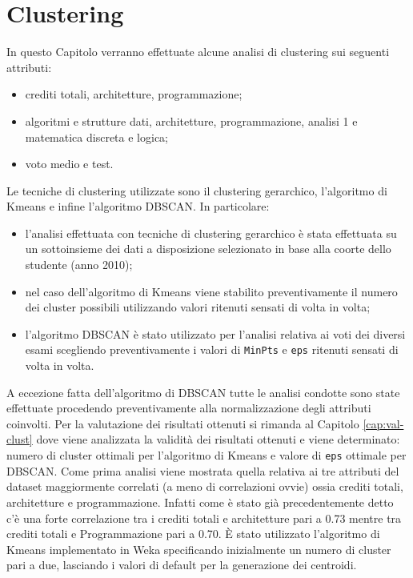 \documentclass[12pt]{article}
\begin{document}
\section{Clustering}
\label{cap:clust}
In questo Capitolo verranno effettuate alcune analisi di clustering sui se\-guenti attributi:
\begin{itemize}
\item crediti totali, architetture, programmazione;
\item algoritmi e strutture dati, architetture, programmazione, analisi 1 e matematica discreta e logica;
\item voto medio e test.
\end{itemize}
Le tecniche di clustering utilizzate sono il clustering gerarchico, l'algori\-tmo di Kmeans e infine l'algoritmo DBSCAN. In particolare:
\begin{itemize}
\item l'analisi effettuata con tecniche di clustering gerarchico è stata effet\-tuata su un sottoinsieme dei dati a disposizione selezionato in base alla coorte dello studente (anno 2010);
\item nel caso dell'algoritmo di Kmeans viene stabilito preventivamente il numero dei cluster possibili utilizzando valori ritenuti sensati di volta in volta;
\item l'algoritmo DBSCAN è stato utilizzato per l'analisi relativa ai voti dei diversi esami scegliendo preventivamente i valori di \texttt{MinPts} e \texttt{eps} ritenuti sensati di volta in volta.
\end{itemize}
A eccezione fatta dell'algoritmo di DBSCAN tutte le analisi condotte sono state effettuate procedendo preventivamente alla normalizzazione degli attributi coinvolti. 
Per la valutazione dei risultati ottenuti si rimanda al Capitolo \ref{cap:val-clust} dove viene analizzata la validità dei risultati ottenuti e viene determinato: 
numero di cluster ottimali per l'algoritmo di Kmeans e valo\-re di \texttt{eps} ottimale per DBSCAN.
Come prima analisi viene mostrata quella relativa ai tre attributi del dataset maggiormente correlati (a meno di 
correlazioni ovvie) ossia crediti totali, architetture e programmazione.
Infatti come è stato già precedentemente detto c'è una forte correlazione tra i crediti totali e architetture pari a 0.73 mentre tra crediti totali e Programmazione pari a 0.70.
È stato utilizzato l'algoritmo di Kmeans implementato in Weka specificando inizialmente un numero di cluster pari a due, lasciando i valori di default per la generazione dei centroidi.
\end{document}
